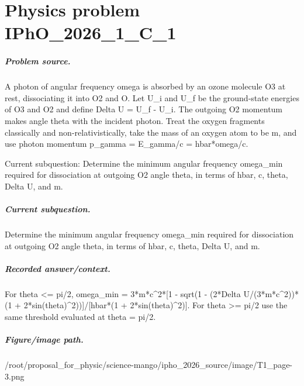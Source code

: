 
\chapter{Physics problem IPhO\_2026\_1\_C\_1}
\label{ch:IPhO2026Problems_problem_IPhO_2026_1_C_1}

\paragraph{Problem source.}
A photon of angular frequency omega is absorbed by an ozone molecule O3 at rest,
dissociating it into O2 and O.  Let U\_i and U\_f be the ground-state energies of
O3 and O2 and define Delta U = U\_f - U\_i.  The outgoing O2 momentum makes angle
theta with the incident photon.  Treat the oxygen fragments classically and
non-relativistically, take the mass of an oxygen atom to be m, and use photon
momentum p\_gamma = E\_gamma/c = hbar*omega/c.

Current subquestion:
Determine the minimum angular frequency omega\_min required for dissociation at outgoing O2 angle theta, in terms of hbar, c, theta, Delta U, and m.

\paragraph{Current subquestion.}
Determine the minimum angular frequency omega\_min required for dissociation at outgoing O2 angle theta, in terms of hbar, c, theta, Delta U, and m.

\paragraph{Recorded answer/context.}
For theta <= pi/2, omega\_min = 3*m*c\textasciicircum{}2*[1 - sqrt(1 - (2*Delta U/(3*m*c\textasciicircum{}2))*(1 + 2*sin(theta)\textasciicircum{}2))]/[hbar*(1 + 2*sin(theta)\textasciicircum{}2)]. For theta >= pi/2 use the same threshold evaluated at theta = pi/2.

\paragraph{Figure/image path.}
/root/proposal\_for\_physic/science-mango/ipho\_2026\_source/image/T1\_page-3.png


